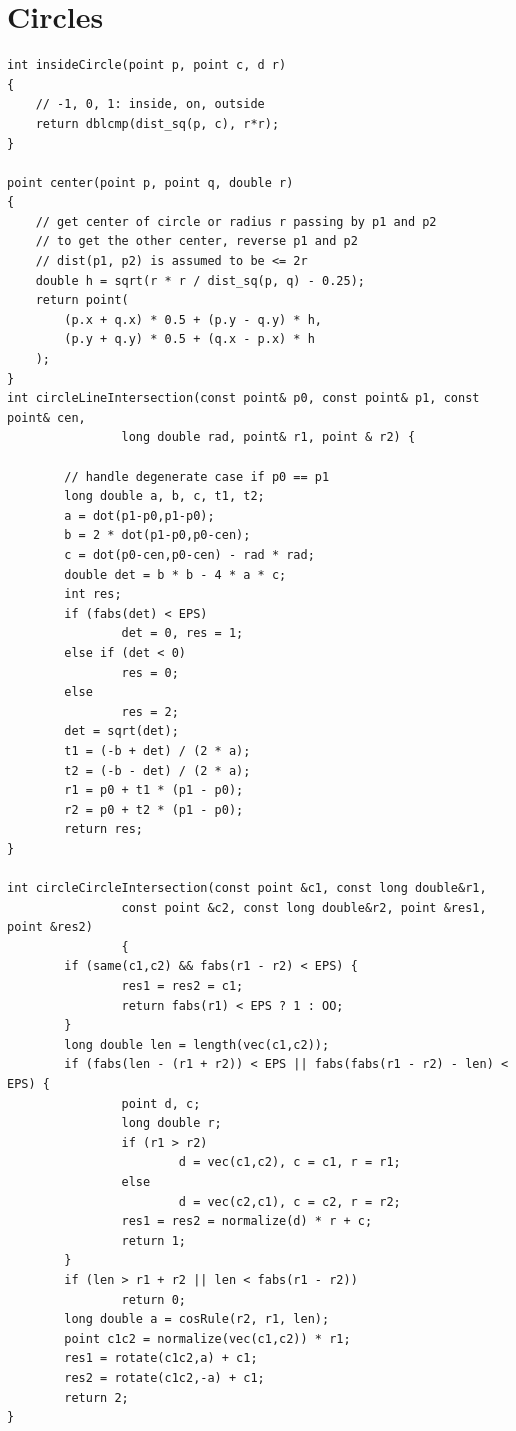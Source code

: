 \documentclass[12pt]{book}
\begin{document}
\section{Circles}
\begin{verbatim}
int insideCircle(point p, point c, d r)
{
	// -1, 0, 1: inside, on, outside
	return dblcmp(dist_sq(p, c), r*r);
}

point center(point p, point q, double r)
{
	// get center of circle or radius r passing by p1 and p2
	// to get the other center, reverse p1 and p2
	// dist(p1, p2) is assumed to be <= 2r
	double h = sqrt(r * r / dist_sq(p, q) - 0.25);
	return point(
		(p.x + q.x) * 0.5 + (p.y - q.y) * h,
		(p.y + q.y) * 0.5 + (q.x - p.x) * h
	);
}
int circleLineIntersection(const point& p0, const point& p1, const point& cen,
                long double rad, point& r1, point & r2) {

        // handle degenerate case if p0 == p1
        long double a, b, c, t1, t2;
        a = dot(p1-p0,p1-p0);
        b = 2 * dot(p1-p0,p0-cen);
        c = dot(p0-cen,p0-cen) - rad * rad;
        double det = b * b - 4 * a * c;
        int res;
        if (fabs(det) < EPS)
                det = 0, res = 1;
        else if (det < 0)
                res = 0;
        else
                res = 2;
        det = sqrt(det);
        t1 = (-b + det) / (2 * a);
        t2 = (-b - det) / (2 * a);
        r1 = p0 + t1 * (p1 - p0);
        r2 = p0 + t2 * (p1 - p0);
        return res;
}

int circleCircleIntersection(const point &c1, const long double&r1,
                const point &c2, const long double&r2, point &res1, point &res2)
                {
        if (same(c1,c2) && fabs(r1 - r2) < EPS) {
                res1 = res2 = c1;
                return fabs(r1) < EPS ? 1 : OO;
        }
        long double len = length(vec(c1,c2));
        if (fabs(len - (r1 + r2)) < EPS || fabs(fabs(r1 - r2) - len) < EPS) {
                point d, c;
                long double r;
                if (r1 > r2)
                        d = vec(c1,c2), c = c1, r = r1;
                else
                        d = vec(c2,c1), c = c2, r = r2;
                res1 = res2 = normalize(d) * r + c;
                return 1;
        }
        if (len > r1 + r2 || len < fabs(r1 - r2))
                return 0;
        long double a = cosRule(r2, r1, len);
        point c1c2 = normalize(vec(c1,c2)) * r1;
        res1 = rotate(c1c2,a) + c1;
        res2 = rotate(c1c2,-a) + c1;
        return 2;
}


\end{verbatim}
\end{document}

